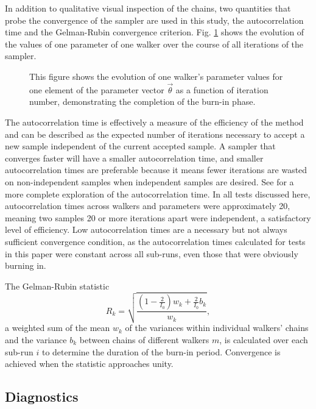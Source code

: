\documentclass[preprint]{aastex}
\begin{document}
In addition to qualitative visual inspection of the chains, two quantities that 
probe the convergence of the sampler are used in this study, the 
autocorrelation time and the Gelman-Rubin convergence criterion.  Fig. 
\ref{fig:chains} shows the evolution of the values of one parameter of one 
walker over the course of all iterations of the sampler.

\begin{figure}
\caption{This figure shows the evolution of one walker's parameter values for 
one element of the parameter vector $\vec{\theta}$ as a function of iteration 
number, demonstrating the completion of the burn-in phase.}
\label{fig:chains}
\end{figure}

The autocorrelation time is effectively a measure of the efficiency of the 
method and can be described as the expected number of iterations necessary to 
accept a new sample independent of the current accepted sample.  A sampler that 
converges faster will have a smaller autocorrelation time, and smaller 
autocorrelation times are preferable because it means fewer iterations are 
wasted on non-independent samples when independent samples are desired.  See 
\citet{Foreman-Mackey2013} for a more complete exploration of the 
autocorrelation time.  In all tests discussed here, autocorrelation times 
across walkers and parameters were approximately 20, meaning two samples 20 or 
more iterations apart were independent, a satisfactory level of efficiency.  
Low autocorrelation times are a necessary but not always sufficient convergence 
condition, as the autocorrelation times calculated for tests in this paper were 
constant across all sub-runs, even those that were obviously burning in.  

The Gelman-Rubin statistic
\begin{equation}
\label{eq:gr}
R_{k} = \sqrt{\frac{(1-\frac{2}{I_{0}})w_{k}+\frac{2}{I_{0}}b_{k}}{w_{k}}},
\end{equation}
a weighted sum of the mean $w_{k}$ of the variances within individual walkers' 
chains and the variance $b_{k}$ between chains of different walkers $m$, is 
calculated over each sub-run $i$ to determine the duration of the burn-in 
period.  Convergence is achieved when the statistic approaches unity.  

\subsection{Diagnostics}
\label{sec:diag}
\end{document}
